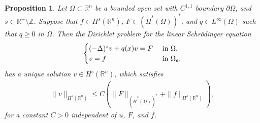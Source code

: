 \documentclass [oneside,11pt] {amsart}
\numberwithin{equation}{section}
\newtheorem{prop}{Proposition}[section]
\newcommand{\R}{\mathbb{R}}
\newcommand{\p}{\partial}
\begin{document}
\begin{prop} \cite[Lemma 5.1]{CMR21} \label{prop_wellposedness_linear} 
Let $\Omega\subset\R^n$ be a bounded open set with $C^{1,1}$ boundary $\p\Omega$, and $s\in \R^+\setminus \mathbb{Z}$. Suppose that $f\in H^s(\R^n)$, $F\in (\widetilde{H}^s(\Omega))^*$, and $q\in L^\infty(\Omega)$ such that $q\ge 0$ in $\Omega$. 
Then the Dirichlet problem for the linear Schr\"odinger equation
\begin{equation}\label{eq_linear}
\begin{cases}
(-\Delta)^s v + q(x)v = F &\hbox{ in } \Omega,\\
v = f &\hbox{ in } \Omega_e,
\end{cases}
\end{equation}
has a unique solution $v\in H^s(\R^n)$, which satisfies
\begin{align}\label{linear schrodinger stability estimate}
\|v\|_{H^s(\R^n)}\le C(\|F\|_{(\widetilde{H}^s(\Omega))^*}+ \|f\|_{H^s(\R^n)}),
\end{align}
for a constant $C>0$ independent of $u$, $F$, and $f$.
\end{prop}
\end{document}

